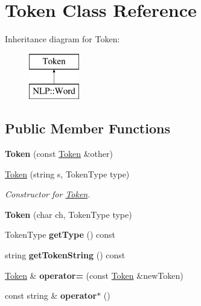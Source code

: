 \hypertarget{classToken}{\section{Token Class Reference}
\label{classToken}
}
Inheritance diagram for Token\-:\begin{figure}[H]
\begin{center}
\leavevmode
\includegraphics[height=2.000000cm]{classToken}
\end{center}
\end{figure}
\subsection*{Public Member Functions}
\begin{DoxyCompactItemize}
\item 
\hypertarget{classToken_a28857fe5c15e75db89ef881dd5a90bea}{{\bfseries Token} (const \hyperlink{classToken}{Token} \&other)}\label{classToken_a28857fe5c15e75db89ef881dd5a90bea}

\item 
\hyperlink{classToken_aeadc72fcf9d09263a0b389a0be75da01}{Token} (string s, Token\-Type type)
\begin{DoxyCompactList}\small\item\em Constructor for \hyperlink{classToken}{Token}. \end{DoxyCompactList}\item 
\hypertarget{classToken_ab21a83f4980dda611ef90d256ad97247}{{\bfseries Token} (char ch, Token\-Type type)}\label{classToken_ab21a83f4980dda611ef90d256ad97247}

\item 
\hypertarget{classToken_ae5f14af971e4c134f8ee4bec6e4a7a90}{Token\-Type {\bfseries get\-Type} () const }\label{classToken_ae5f14af971e4c134f8ee4bec6e4a7a90}

\item 
\hypertarget{classToken_a747191a1624f99f687e1827d42f81c2a}{string {\bfseries get\-Token\-String} () const }\label{classToken_a747191a1624f99f687e1827d42f81c2a}

\item 
\hypertarget{classToken_a6d59126590e655d6927239d127bcd083}{\hyperlink{classToken}{Token} \& {\bfseries operator=} (const \hyperlink{classToken}{Token} \&new\-Token)}\label{classToken_a6d59126590e655d6927239d127bcd083}

\item 
\hypertarget{classToken_a4d1f55521bbe30c59828530a3c3b3923}{const string \& {\bfseries operator$\ast$} ()}\label{classToken_a4d1f55521bbe30c59828530a3c3b3923}

\end{DoxyCompactItemize}
